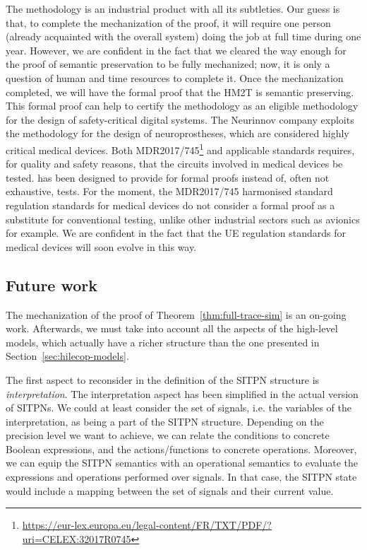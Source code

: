 \documentclass[pdflatex,sn-mathphys]{sn-jnl}%
\theoremstyle{thmstyleone}%
\theoremstyle{thmstyletwo}%
\theoremstyle{thmstylethree}%
\begin{document}
The \hilecop{} methodology is an industrial product with all its
subtleties. Our guess is that, to complete the mechanization of the
proof, it will require one person (already acquainted with the overall
system) doing the job at full time during one year.  However, we are
confident in the fact that we cleared the way enough for the proof of
semantic preservation to be fully mechanized; now, it is only a
question of human and time resources to complete it.  Once the
mechanization completed, we will have the formal proof that the HM2T
is semantic preserving. This formal proof can help to certify the
\hilecop{} methodology as an eligible methodology for the design of
safety-critical digital systems.  The Neurinnov company exploits the
\hilecop{} methodology for the design of neuroprostheses, which are
considered highly critical medical devices. %
Both
MDR2017/745\footnote{\url{https://eur-lex.europa.eu/legal-content/FR/TXT/PDF/?uri=CELEX:32017R0745}}
and applicable standards requires, for quality and safety reasons,
that the circuits involved in medical devices be tested. \hilecop{}
has been designed to provide for formal proofs instead of, often not
exhaustive, tests.  For the moment, the MDR2017/745 harmonised
standard regulation standards for medical devices do not consider a
formal proof as a substitute for conventional testing, unlike other
industrial sectors such as avionics for example. We are confident in
the fact that the UE regulation standards for medical devices will
soon evolve in this way.


\subsection{Future work}
\label{sec:future}

The mechanization of the proof of Theorem~\ref{thm:full-trace-sim} is
an on-going work.  Afterwards, we must take into account all the
aspects of the \hilecop{} high-level models, which actually have a
richer structure than the one presented in
Section~\ref{sec:hilecop-models}.

The first aspect to reconsider in the definition of the SITPN
structure is \textit{interpretation}. The interpretation aspect has
been simplified in the actual version of SITPNs. We could at least
consider the set of \vhdl{} signals, i.e. the variables of the
interpretation, as being a part of the SITPN structure. Depending on
the precision level we want to achieve, we can relate the conditions
to concrete Boolean expressions, and the actions/functions to concrete
operations. Moreover, we can equip the SITPN semantics with an
operational semantics to evaluate the expressions and operations
performed over \vhdl{} signals. In that case, the SITPN state would
include a mapping between the set of \vhdl{} signals and their current
value.
\end{document}
